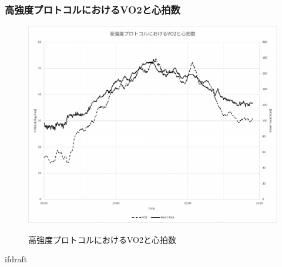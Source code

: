 \subsubsection{高強度プロトコルにおけるVO2と心拍数}

\begin{figure}[H]
  \begin{center}
    \label{fig:hard_vo2_hr}
    \includegraphics[width=12cm]{fig/hard_vo2_hr}
    \caption{高強度プロトコルにおけるVO2と心拍数}
  \end{center}
\end{figure}

\expandafter\ifx\csname ifdraft\endcsname\relax
  
\fi
